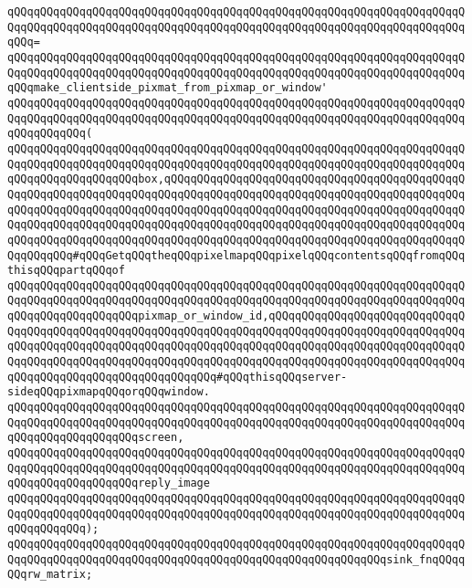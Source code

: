 \verb|qQQqqQQqqQQqqQQqqQQqqQQqqQQqqQQqqQQqqQQqqQQqqQQqqQQqqQQqqQQqqQQqqQQqqQQqqQQqqQQqqQQqqQQqqQQqqQQqqQQqqQQqqQQqqQQqqQQqqQQqqQQqqQQqqQQqqQQqqQQqqQQq=|\newline
\verb|qQQqqQQqqQQqqQQqqQQqqQQqqQQqqQQqqQQqqQQqqQQqqQQqqQQqqQQqqQQqqQQqqQQqqQQqqQQqqQQqqQQqqQQqqQQqqQQqqQQqqQQqqQQqqQQqqQQqqQQqqQQqqQQqqQQqqQQqqQQqqQQqmake_clientside_pixmat_from_pixmap_or_window'|\newline
\verb|qQQqqQQqqQQqqQQqqQQqqQQqqQQqqQQqqQQqqQQqqQQqqQQqqQQqqQQqqQQqqQQqqQQqqQQqqQQqqQQqqQQqqQQqqQQqqQQqqQQqqQQqqQQqqQQqqQQqqQQqqQQqqQQqqQQqqQQqqQQqqQQqqQQqqQQq(|\newline
\verb|qQQqqQQqqQQqqQQqqQQqqQQqqQQqqQQqqQQqqQQqqQQqqQQqqQQqqQQqqQQqqQQqqQQqqQQqqQQqqQQqqQQqqQQqqQQqqQQqqQQqqQQqqQQqqQQqqQQqqQQqqQQqqQQqqQQqqQQqqQQqqQQqqQQqqQQqqQQqqQQqbox,qQQqqQQqqQQqqQQqqQQqqQQqqQQqqQQqqQQqqQQqqQQqqQQqqQQqqQQqqQQqqQQqqQQqqQQqqQQqqQQqqQQqqQQqqQQqqQQqqQQqqQQqqQQqqQQqqQQqqQQqqQQqqQQqqQQqqQQqqQQqqQQqqQQqqQQqqQQqqQQqqQQqqQQqqQQqqQQqqQQqqQQqqQQqqQQqqQQqqQQqqQQqqQQqqQQqqQQqqQQqqQQqqQQqqQQqqQQqqQQqqQQqqQQqqQQqqQQqqQQqqQQqqQQqqQQqqQQqqQQqqQQqqQQqqQQqqQQqqQQqqQQqqQQqqQQqqQQqqQQqqQQqqQQqqQQqqQQq#qQQqGetqQQqtheqQQqpixelmapqQQqpixelqQQqcontentsqQQqfromqQQqthisqQQqpartqQQqof|\newline
\verb|qQQqqQQqqQQqqQQqqQQqqQQqqQQqqQQqqQQqqQQqqQQqqQQqqQQqqQQqqQQqqQQqqQQqqQQqqQQqqQQqqQQqqQQqqQQqqQQqqQQqqQQqqQQqqQQqqQQqqQQqqQQqqQQqqQQqqQQqqQQqqQQqqQQqqQQqqQQqqQQqpixmap_or_window_id,qQQqqQQqqQQqqQQqqQQqqQQqqQQqqQQqqQQqqQQqqQQqqQQqqQQqqQQqqQQqqQQqqQQqqQQqqQQqqQQqqQQqqQQqqQQqqQQqqQQqqQQqqQQqqQQqqQQqqQQqqQQqqQQqqQQqqQQqqQQqqQQqqQQqqQQqqQQqqQQqqQQqqQQqqQQqqQQqqQQqqQQqqQQqqQQqqQQqqQQqqQQqqQQqqQQqqQQqqQQqqQQqqQQqqQQqqQQqqQQqqQQqqQQqqQQqqQQqqQQqqQQqqQQqqQQq#qQQqthisqQQqserver-sideqQQqpixmapqQQqorqQQqwindow.|\newline
\verb|qQQqqQQqqQQqqQQqqQQqqQQqqQQqqQQqqQQqqQQqqQQqqQQqqQQqqQQqqQQqqQQqqQQqqQQqqQQqqQQqqQQqqQQqqQQqqQQqqQQqqQQqqQQqqQQqqQQqqQQqqQQqqQQqqQQqqQQqqQQqqQQqqQQqqQQqqQQqqQQqscreen,|\newline
\verb|qQQqqQQqqQQqqQQqqQQqqQQqqQQqqQQqqQQqqQQqqQQqqQQqqQQqqQQqqQQqqQQqqQQqqQQqqQQqqQQqqQQqqQQqqQQqqQQqqQQqqQQqqQQqqQQqqQQqqQQqqQQqqQQqqQQqqQQqqQQqqQQqqQQqqQQqqQQqqQQqreply_image|\newline
\verb|qQQqqQQqqQQqqQQqqQQqqQQqqQQqqQQqqQQqqQQqqQQqqQQqqQQqqQQqqQQqqQQqqQQqqQQqqQQqqQQqqQQqqQQqqQQqqQQqqQQqqQQqqQQqqQQqqQQqqQQqqQQqqQQqqQQqqQQqqQQqqQQqqQQqqQQq);|\newline
\newline
\verb|qQQqqQQqqQQqqQQqqQQqqQQqqQQqqQQqqQQqqQQqqQQqqQQqqQQqqQQqqQQqqQQqqQQqqQQqqQQqqQQqqQQqqQQqqQQqqQQqqQQqqQQqqQQqqQQqqQQqqQQqqQQqqQQqsink_fnqQQqqQQqrw_matrix;|\newline
